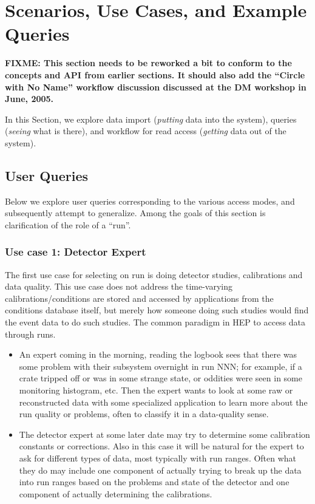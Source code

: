 \documentclass{cmspaper}
\begin{document}
{ 
\section{Scenarios, Use Cases, and Example Queries}

{\bf FIXME: This section needs to be reworked a bit to conform to the
concepts and API from earlier sections. It should also add the ``Circle
with No Name'' workflow discussion discussed at the DM workshop in June, 
2005.}

In this Section, we explore data import
({\em putting} data into the system), queries ({\em seeing} what is there),
and workflow for read access ({\em getting} data out of the system).

\subsection{User Queries}

Below we explore user queries corresponding to the various access modes,
and subsequently attempt to generalize. Among the goals of this section
is clarification of the role of a ``run''.

\subsubsection{Use case 1: Detector Expert}

  The first use case for selecting on run is doing detector studies,
calibrations and data quality. This use case does not address the
time-varying calibrations/conditions are stored and accessed by
applications from the conditions database itself, but merely how someone
doing such studies would find the event data to do such studies. The
common paradigm in HEP to access data through runs.

\begin{itemize}

\item An expert coming in the morning, reading the logbook sees that there was
     some problem with their subsystem overnight in run NNN; for example,
     if a crate tripped off or was in some strange state, or oddities
     were seen in some monitoring histogram, etc. Then the expert wants
     to look at some raw or reconstructed data with some specialized
     application to learn more about the run quality or problems, often
     to classify it in a data-quality sense.

\item The detector expert at some later date may try to determine
     some calibration constants or corrections. Also in this case it
     will be natural for the expert to ask for different types of data,
     most typically with run ranges. Often what they do may include one
     component of actually trying to break up the data into run ranges
     based on the problems and state of the detector and one component
     of actually determining the calibrations.


\end{itemize}}
\end{document}
